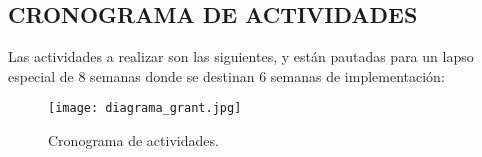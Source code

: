 
\subsection{CRONOGRAMA DE ACTIVIDADES}

	Las actividades a realizar son las siguientes, y están pautadas para un lapso especial de 8 semanas donde se destinan 6 semanas de implementación: 

	\begin{figure}[htb]
		\centering
		\caption{Cronograma de actividades.}
		\label{cronograma}
		\texttt{[image: diagrama\_grant.jpg]}
	\end{figure}
